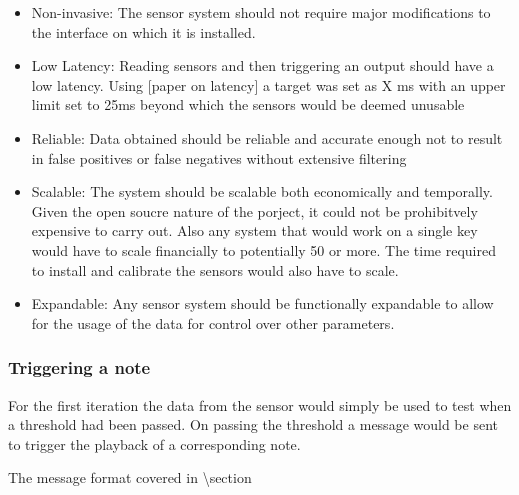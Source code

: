 \begin{itemize}
\item
  Non-invasive: The sensor system should not require major modifications
  to the interface on which it is installed.
\item
  Low Latency: Reading sensors and then triggering an output should have
  a low latency. Using {[}paper on latency{]} a target was set as X ms
  with an upper limit set to 25ms beyond which the sensors would be
  deemed unusable
\item
  Reliable: Data obtained should be reliable and accurate enough not to
  result in false positives or false negatives without extensive
  filtering
\item
  Scalable: The system should be scalable both economically and
  temporally. Given the open soucre nature of the porject, it could not
  be prohibitvely expensive to carry out. Also any system that would
  work on a single key would have to scale financially to potentially 50
  or more. The time required to install and calibrate the sensors would
  also have to scale.
\item
  Expandable: Any sensor system should be functionally expandable to
  allow for the usage of the data for control over other parameters.
\end{itemize}

\subsubsection{Triggering a note}\label{triggering-a-note}

For the first iteration the data from the sensor would simply be used to
test when a threshold had been passed. On passing the threshold a
message would be sent to trigger the playback of a corresponding note.

The message format covered in \textbackslash section



